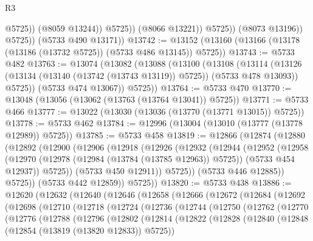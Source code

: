 \begin{lexlean}{R3}
\begin{coremodule}
                            @5725))
                        (@8059 @13244))
                      @5725))
                  (@8066 @13221))
                @5725))
            (@8073 @13196))
          @5725))
      (@5733 @490 @13171))
@13742 := @13152 (@13160 (@13166 (@13178 (@13186 (@13732 @5725)) (@5733 @486 @13145)) @5725))
@13743 := @5733 @482
@13763 := @13074
    (@13082
      (@13088
        (@13100
          (@13108
            (@13114
              (@13126 (@13134 (@13140 (@13742 (@13743 @13119)) @5725)) (@5733 @478 @13093))
              @5725))
          (@5733 @474 @13067))
        @5725))
@13764 := @5733 @470
@13770 := @13048 (@13056 (@13062 (@13763 (@13764 @13041)) @5725))
@13771 := @5733 @466
@13777 := @13022 (@13030 (@13036 (@13770 (@13771 @13015)) @5725))
@13778 := @5733 @462
@13784 := @12996 (@13004 (@13010 (@13777 (@13778 @12989)) @5725))
@13785 := @5733 @458
@13819 := @12866
    (@12874
      (@12880
        (@12892
          (@12900
            (@12906
              (@12918
                (@12926
                  (@12932
                    (@12944
                      (@12952
                        (@12958
                          (@12970
                            (@12978 (@12984 (@13784 (@13785 @12963)) @5725))
                            (@5733 @454 @12937))
                          @5725))
                      (@5733 @450 @12911))
                    @5725))
                (@5733 @446 @12885))
              @5725))
          (@5733 @442 @12859))
        @5725))
@13820 := @5733 @438
@13886 := @12620
    (@12632
      (@12640
        (@12646
          (@12658
            (@12666
              (@12672
                (@12684
                  (@12692
                    (@12698
                      (@12710
                        (@12718
                          (@12724
                            (@12736
                              (@12744
                                (@12750
                                  (@12762
                                    (@12770
                                      (@12776
                                        (@12788
                                          (@12796
                                            (@12802
                                              (@12814
                                                (@12822
                                                  (@12828
                                                    (@12840
                                                      (@12848
                                                        (@12854 (@13819 (@13820 @12833)) @5725))

\end{coremodule}
\end{lexlean}
